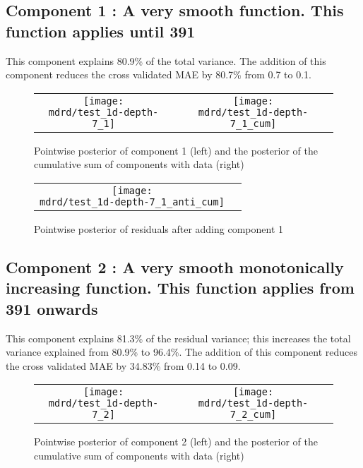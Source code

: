 \documentclass{article} %
\begin{document}
\subsection{Component 1 : A very smooth function. This function applies until  391}



This component explains 80.9\% of the total variance.
The addition of this component reduces the cross validated MAE by 80.7\% from 0.7 to 0.1.


\begin{figure}[H]
\newcommand{\wmgd}{0.5\columnwidth}
\newcommand{\hmgd}{3.0cm}
\newcommand{\mdrd}{test_1d-depth-7}
\newcommand{\mbm}{\hspace{-0.3cm}}
\begin{tabular}{cc}
\mbm \texttt{[image: \\mdrd/test\_1d-depth-7\_1]} & \texttt{[image: \\mdrd/test\_1d-depth-7\_1\_cum]}
\end{tabular}
\caption{Pointwise posterior of component 1 (left) and the posterior of the cumulative sum of components with data (right)}
\label{fig:comp1}
\end{figure}

\begin{figure}[H]
\newcommand{\wmgd}{0.5\columnwidth}
\newcommand{\hmgd}{3.0cm}
\newcommand{\mdrd}{test_1d-depth-7}
\newcommand{\mbm}{\hspace{-0.3cm}}
\begin{tabular}{cc}
\mbm \texttt{[image: \\mdrd/test\_1d-depth-7\_1\_anti\_cum]}
\end{tabular}
\caption{Pointwise posterior of residuals after adding component 1}
\label{fig:comp1}
\end{figure}

\subsection{Component 2 : A very smooth monotonically increasing function. This function applies from  391 onwards}



This component explains 81.3\% of the residual variance; this increases the total variance explained from 80.9\% to 96.4\%.
The addition of this component reduces the cross validated MAE by 34.83\% from 0.14 to 0.09.


\begin{figure}[H]
\newcommand{\wmgd}{0.5\columnwidth}
\newcommand{\hmgd}{3.0cm}
\newcommand{\mdrd}{test_1d-depth-7}
\newcommand{\mbm}{\hspace{-0.3cm}}
\begin{tabular}{cc}
\mbm \texttt{[image: \\mdrd/test\_1d-depth-7\_2]} & \texttt{[image: \\mdrd/test\_1d-depth-7\_2\_cum]}
\end{tabular}
\caption{Pointwise posterior of component 2 (left) and the posterior of the cumulative sum of components with data (right)}
\label{fig:comp2}
\end{figure}
\end{document}
